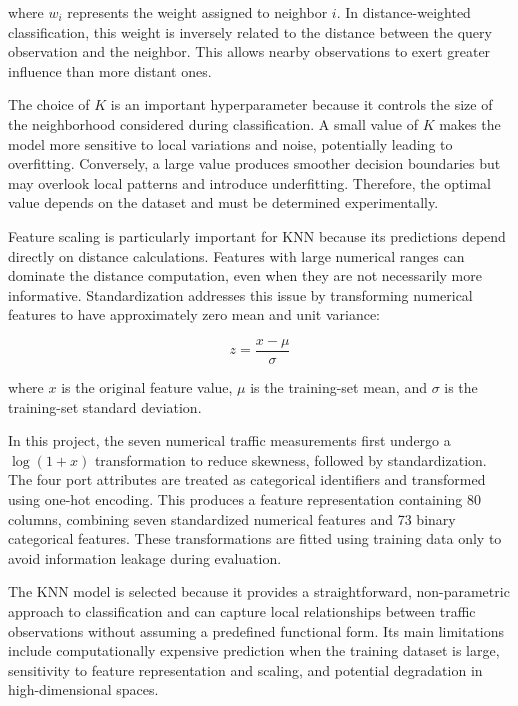 where $w_i$ represents the weight assigned to neighbor $i$. In distance-weighted classification, this weight is inversely related to the distance between the query observation and the neighbor. This allows nearby observations to exert greater influence than more distant ones.

The choice of $K$ is an important hyperparameter because it controls the size of the neighborhood considered during classification. A small value of $K$ makes the model more sensitive to local variations and noise, potentially leading to overfitting. Conversely, a large value produces smoother decision boundaries but may overlook local patterns and introduce underfitting. Therefore, the optimal value depends on the dataset and must be determined experimentally.

Feature scaling is particularly important for KNN because its predictions depend directly on distance calculations. Features with large numerical ranges can dominate the distance computation, even when they are not necessarily more informative. Standardization addresses this issue by transforming numerical features to have approximately zero mean and unit variance:

\begin{equation}
    z = \frac{x-\mu}{\sigma}
    \label{eq:standardization}
\end{equation}

where $x$ is the original feature value, $\mu$ is the training-set mean, and $\sigma$ is the training-set standard deviation.

In this project, the seven numerical traffic measurements first undergo a $\log(1+x)$ transformation to reduce skewness, followed by standardization. The four port attributes are treated as categorical identifiers and transformed using one-hot encoding. This produces a feature representation containing 80 columns, combining seven standardized numerical features and \num{73} binary categorical features. These transformations are fitted using training data only to avoid information leakage during evaluation.

The KNN model is selected because it provides a straightforward, non-parametric approach to classification and can capture local relationships between traffic observations without assuming a predefined functional form. Its main limitations include computationally expensive prediction when the training dataset is large, sensitivity to feature representation and scaling, and potential degradation in high-dimensional spaces.

